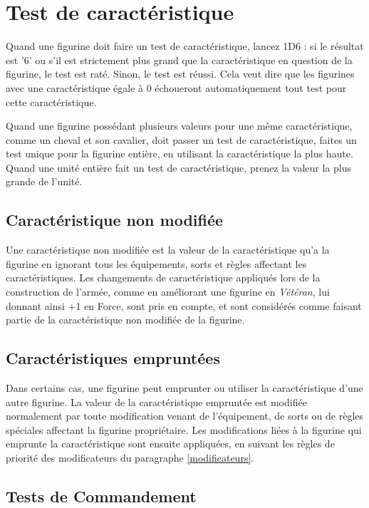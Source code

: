 \section{Test de caractéristique}

Quand une figurine doit faire un test de caractéristique, lancez 1D6 : si le résultat est '6' ou s'il est strictement plus grand que la caractéristique en question de la figurine, le test est raté. Sinon, le test est réussi. Cela veut dire que les figurines avec une caractéristique égale à 0 échoueront automatiquement tout test pour cette caractéristique.

Quand une figurine possédant plusieurs valeurs pour une même caractéristique, comme un cheval et son cavalier, doit passer un test de caractéristique, faites un test unique pour la figurine entière, en utilisant la caractéristique la plus haute. Quand une unité entière fait un test de caractéristique, prenez la valeur la plus grande de l'unité.

\subsection{Caractéristique non modifiée}

Une caractéristique non modifiée est la valeur de la caractéristique qu'a la figurine en ignorant tous les équipements, sorts et règles affectant les caractéristiques. Les changements de caractéristique appliqués lors de la construction de l'armée, comme en améliorant une figurine en \emph{Vétéran}, lui donnant ainsi +1 en Force, sont pris en compte, et sont considérés comme faisant partie de la caractéristique non modifiée de la figurine.

\subsection{Caractéristiques empruntées}

Dans certains cas,  une figurine peut emprunter ou utiliser la caractéristique d'une autre figurine. La valeur de la caractéristique empruntée est modifiée normalement par toute modification venant de l'équipement, de sorts ou de règles spéciales affectant la figurine propriétaire. Les modifications liées à la figurine qui emprunte la caractéristique sont ensuite appliquées, en suivant les règles de priorité des modificateurs du paragraphe \ref{modificateurs}.

\subsection{Tests de Commandement}

